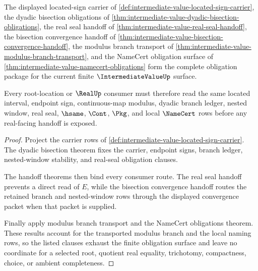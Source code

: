 \begin{theorem}
\label{thm:intermediate-value-obligation-closure-package}
The displayed located-sign carrier of \autoref{def:intermediate-value-located-sign-carrier}, the dyadic bisection obligations of \autoref{thm:intermediate-value-dyadic-bisection-obligations}, the real seal handoff of \autoref{thm:intermediate-value-real-seal-handoff}, the bisection convergence handoff of \autoref{thm:intermediate-value-bisection-convergence-handoff}, the modulus branch transport of \autoref{thm:intermediate-value-modulus-branch-transport}, and the NameCert obligation surface of \autoref{thm:intermediate-value-namecert-obligations} form the complete obligation package for the current finite $\IntermediateValueUp$ surface.

Every root-location or $\RealUp$ consumer must therefore read the same located interval, endpoint sign, continuous-map modulus, dyadic branch ledger, nested window, real seal, $\hsame$, $\Cont$, $\Pkg$, and local $\NameCert$ rows before any real-facing handoff is exposed.
\end{theorem}
\begin{proof}
Project the carrier rows of \autoref{def:intermediate-value-located-sign-carrier}. The dyadic bisection theorem fixes the carrier, endpoint signs, branch ledger, nested-window stability, and real-seal obligation clauses.

The handoff theorems then bind every consumer route. The real seal handoff prevents a direct read of $E$, while the bisection convergence handoff routes the retained branch and nested-window rows through the displayed convergence packet when that packet is supplied.

Finally apply modulus branch transport and the NameCert obligations theorem. These results account for the transported modulus branch and the local naming rows, so the listed clauses exhaust the finite obligation surface and leave no coordinate for a selected root, quotient real equality, trichotomy, compactness, choice, or ambient completeness.
\end{proof}


